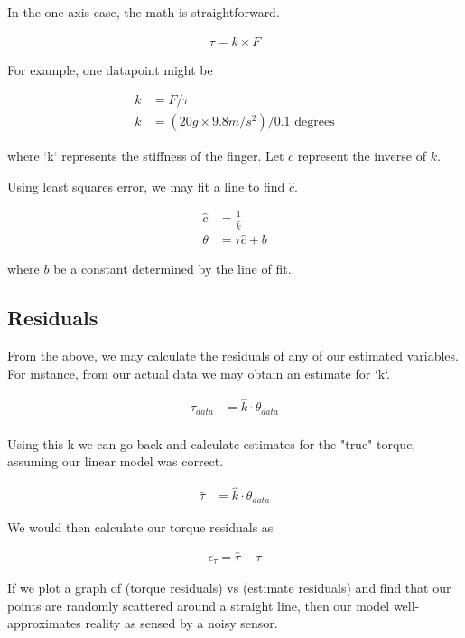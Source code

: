 \documentclass[preprint,12pt,3p]{elsarticle}
\begin{document}
In the one-axis case, the math is straightforward.

\begin{align}
\tau = k \times F
\end{align}

For example, one datapoint might be

\begin{align}
k &= F / \tau \\
k &= (20g \times 9.8 m/s^2)/0.1 \text{ degrees}
\end{align}

where `k` represents the stiffness of the finger. Let $c$ represent the inverse of $k$.

Using least squares error, we may fit a line to find $\hat{c}$. 

\begin{align}
 \hat{c} &= \frac{1}{\hat{k}} \\
 \theta &= \tau \hat{c} + b
\end{align}

where $b$ be a constant determined by the line of fit.



\subsection{Residuals}

From the above, we may calculate the residuals of any of our estimated variables.
For instance, from our actual data we may obtain an estimate for `k`.

\begin{align}
 \tau_{data} &= \hat{k} \cdot \theta_{data} \\
\end{align}

Using this k we can go back and calculate estimates for the "true" torque, assuming our linear model was correct.

\begin{align}
 \hat{\tau} &= \hat{k} \cdot \theta_{data} 
\end{align}

We would then calculate our torque residuals as

\begin{align}
 \epsilon_{\tau} = \hat{\tau} - \tau 
\end{align}

If we plot a graph of (torque residuals) vs (estimate residuals) and find that our points are randomly scattered around a straight line, then our model well-approximates reality as sensed by a noisy sensor.
\end{document}
